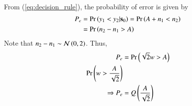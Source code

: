 \documentclass[journal,12pt,twocolumn]{IEEEtran}
\renewcommand\thesection{\arabic{section}}
\begin{document}
\begin{enumerate}[label=\thesection.\arabic*
,ref=\thesection.\theenumi]
\begin{align}
\end{align}
From (\ref{eq:decision_rule}), the probability of error is given by 
\begin{align}
P_e &= \Pr\left(y_1 < y_2 |\mathbf{s}_0\right) = \Pr\left(A+n_1 < n_2\right)\\
&= \Pr\left(n_2 - n_1 > A\right)
\end{align}
Note that $n_2 - n_1 \sim \mathcal{N}\left(0,2\right)$. Thus,
\begin{align}
P_e &= \Pr\left(\sqrt{2}w > A\right)\\
\Pr\left(w > \dfrac{A}{\sqrt{2}}\right)\\
\Rightarrow P_e &= Q\left(\frac{A}{\sqrt{2}}\right)
\end{align}


\end{enumerate}
\end{document}
